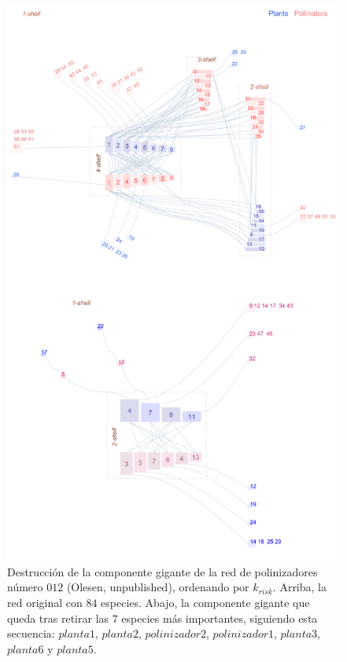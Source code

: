 \begin{figure}[htp!]
\centering
\includegraphics[scale=0.12]{Figures/DEST_M_PL_012_ziggurat_hf_destruction.png}
\caption {Destrucción de la componente gigante de la red de polinizadores número $012$ (Olesen, unpublished), ordenando por $k_{risk}$. Arriba, la red original con $84$ especies. Abajo, la componente gigante que queda tras retirar las $7$ especies más importantes, siguiendo esta secuencia: $planta1$, $planta2$, $polinizador2$, $polinizador1$, $planta3$, $planta6$ y $planta5$.}
\label{fig:DEST_M_PL_012_ziggurat_hf_destruction}
\end{figure}

